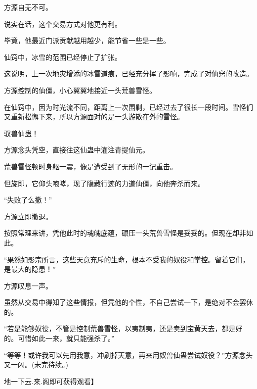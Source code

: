 \begin{this_body}
方源自无不可。

说实在话，这个交易方式对他更有利。

毕竟，他最近门派贡献越用越少，能节省一些是一些。

仙窍中，冰雪的范围已经停止了扩张。

这说明，上一次地灾增添的冰雪道痕，已经充分挥了影响，完成了对仙窍的改造。

方源控制的仙僵，小心翼翼地接近一头荒兽雪怪。

在仙窍中，因为时光流不同，距离上一次围剿，已经过去了很长一段时间。雪怪们又重新松懈下来，所以方源面对的是一头游散在外的雪怪。

驭兽仙蛊！

方源念头凭空，直接往这仙蛊中灌注青提仙元。

荒兽雪怪顿时身躯一震，像是遭受到了无形的一记重击。

但旋即，它仰头咆哮，现了隐藏行迹的力道仙僵，向他奔杀而来。

“失败了么撤！”

方源立即撤退。

按照常理来讲，凭他此时的魂魄底蕴，碾压一头荒兽雪怪是妥妥的。但现在却非如此。

“果然如影宗所言，这些天意充斥的生命，根本不受我的奴役和掌控。留着它们，是最大的隐患！”

方源叹息一声。

虽然从交易中得知了这些情报，但凭他的个性，不自己尝试一下，是绝对不会罢休的。

“若是能够奴役，不管是控制荒兽雪怪，以夷制夷，还是卖到宝黄天去，都是好的。可惜如此一来，就只能强杀了。”

“等等！或许我可以先用我意，冲刷掉天意，再来用奴兽仙蛊尝试奴役？”方源念头又一闪。(未完待续。)

地一下云.来.阁即可获得观看】

\end{this_body}

